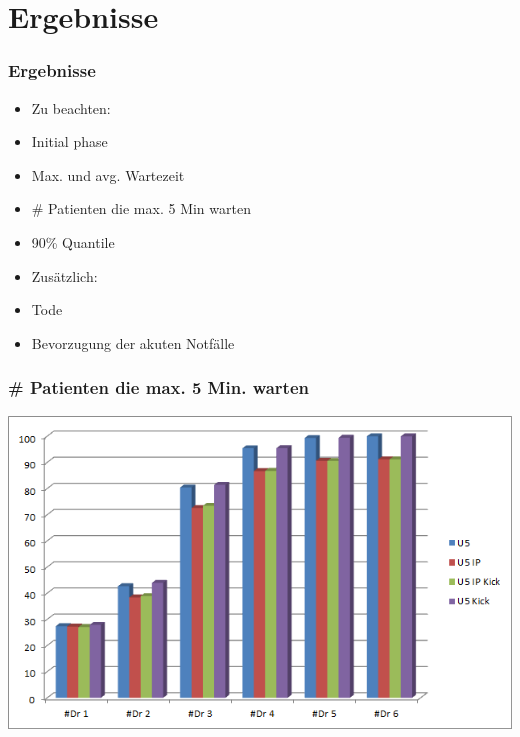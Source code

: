 \documentclass{beamer}
\begin{document}
%
\section{Ergebnisse}
%
%
\begin{frame}
	\frametitle{Ergebnisse}
	\begin{minipage}{.5\textwidth}
		\begin{flushleft}		
			\begin{itemize}
				\item[] Zu beachten:
				\item Initial phase
				\item Max. und avg. Wartezeit
				\item \# Patienten die max. 5 Min warten
				\item 90\% Quantile
			\end{itemize}
		\end{flushleft}
	\end{minipage}
	\begin{minipage}{.4\textwidth}
		\begin{flushright}
			\begin{itemize}
				\item[] Zus\"{a}tzlich:
				\item Tode
				\item Bevorzugung der akuten Notf\"{a}lle
			\end{itemize}
		\end{flushright}
	\end{minipage}
\end{frame}

\begin{frame}
	\frametitle{\# Patienten die max. 5 Min. warten}
	\begin{center}
		\includegraphics[scale=0.6]{img/U5.png}
	\end{center}
\end{frame}
\end{document}
